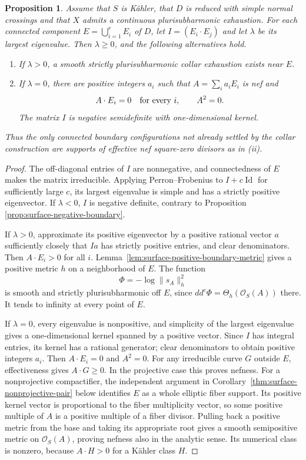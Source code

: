 \documentclass[11pt]{amsart}
\newtheorem{proposition}[theorem]{Proposition}
\theoremstyle{definition}
\theoremstyle{remark}
\numberwithin{equation}{section}
\newcommand{\OO}{\mathcal O}
\newcommand{\ddc}{dd^c}
\begin{document}
\begin{proposition}\label{prop:surface-boundary-matrix}
Assume that $S$ is K\"ahler, that $D$ is reduced with simple normal crossings and that $X$
admits a continuous plurisubharmonic exhaustion.  For each connected
component $E=\bigcup_{i=1}^rE_i$ of $D$, let
$I=(E_i\cdot E_j)$ and let $\lambda$ be its largest eigenvalue.
Then $\lambda\ge0$, and the following alternatives hold.
\begin{enumerate}[label=\textup{(\roman*)},leftmargin=2.5em]
\item If $\lambda>0$, a smooth strictly plurisubharmonic collar
exhaustion exists near $E$.
\item If $\lambda=0$, there are positive integers $a_i$ such that
$A=\sum_i a_iE_i$ is nef and
\[
 A\cdot E_i=0\quad\hbox{for every }i,\qquad A^2=0.
\]
The matrix $I$ is negative semidefinite with one-dimensional kernel.
\end{enumerate}
Thus the only connected boundary configurations not already settled by
the collar construction are supports of effective nef square-zero
divisors as in \textup{(ii)}.
\end{proposition}
\begin{proof}
The off-diagonal entries of $I$ are nonnegative, and connectedness of
$E$ makes the matrix irreducible.  Applying Perron--Frobenius to $I+c
\operatorname{Id}$ for sufficiently large $c$, its largest eigenvalue
is simple and has a strictly positive eigenvector.  If $\lambda<0$,
$I$ is negative definite, contrary to Proposition~
\ref{prop:surface-negative-boundary}.

If $\lambda>0$, approximate its positive eigenvector by a positive
rational vector $a$ sufficiently closely that $Ia$ has strictly
positive entries, and clear denominators.  Then $A\cdot E_i>0$ for
all $i$.  Lemma~\ref{lem:surface-positive-boundary-metric} gives a
positive metric $h$ on a neighborhood of $E$.  The function
\[
 \Phi=-\log\|s_A\|_h^2
\]
is smooth and strictly plurisubharmonic off $E$, since
$\ddc\Phi=\Theta_h(\OO_S(A))$ there.  It tends to infinity at every
point of $E$.

If $\lambda=0$, every eigenvalue is nonpositive, and simplicity of the
largest eigenvalue gives a one-dimensional kernel spanned by a
positive vector.  Since $I$ has integral entries, its kernel has a
rational generator; clear denominators to obtain positive integers
$a_i$.  Then $A\cdot E_i=0$ and $A^2=0$.  For any irreducible curve
$G$ outside $E$, effectiveness gives $A\cdot G\ge0$.  In the
projective case this proves nefness.  For a nonprojective compactifier,
the independent argument in Corollary~\ref{thm:surface-nonprojective-pair}
below identifies $E$ as a whole elliptic fiber support.  Its positive
kernel vector is proportional to the fiber multiplicity vector, so
some positive multiple of $A$ is a positive multiple of a fiber divisor.
Pulling back a
positive metric from the base and taking its appropriate root gives
a smooth semipositive metric on $\OO_S(A)$, proving nefness also in
the analytic sense.  Its numerical class is nonzero, because
$A\cdot H>0$ for a
K\"ahler class $H$.
\end{proof}
\end{document}
